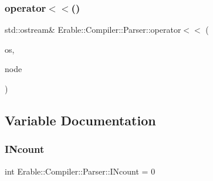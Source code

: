 \subsubsection{\texorpdfstring{operator$<$$<$()}{operator<<()}}
{\footnotesize\ttfamily std\+::ostream\& Erable\+::\+Compiler\+::\+Parser\+::operator$<$$<$ (\begin{DoxyParamCaption}\item[{std\+::ostream \&}]{os,  }\item[{const \mbox{\hyperlink{struct_erable_1_1_compiler_1_1_parser_1_1_iteration_node}{Iteration\+Node}} \&}]{node }\end{DoxyParamCaption})}



\subsection{Variable Documentation}
\mbox{\label{namespace_erable_1_1_compiler_1_1_parser_a5260f4c5af0518e9d815d1118e7c4350}} 
\subsubsection{\texorpdfstring{INcount}{INcount}}
{\footnotesize\ttfamily int Erable\+::\+Compiler\+::\+Parser\+::\+I\+Ncount = 0\hspace{0.3cm}{\ttfamily [inline]}}

